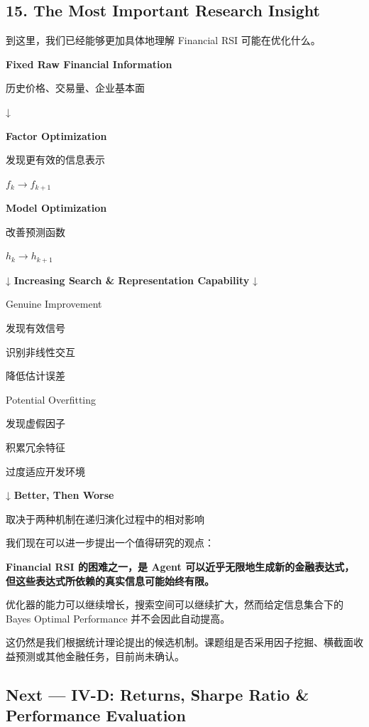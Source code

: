 \hypertarget{part-4-63-0001-the-most-important-research-insight}{%
\subsection{15. The Most Important Research Insight}\label{part-4-63-0001-the-most-important-research-insight}}

到这里，我们已经能够更加具体地理解 Financial RSI 可能在优化什么。

\textbf{Fixed Raw Financial Information}

历史价格、交易量、企业基本面

↓

\textbf{Factor Optimization}

发现更有效的信息表示

\(f_k\rightarrow f_{k+1}\)

\textbf{Model Optimization}

改善预测函数

\(h_k\rightarrow h_{k+1}\)

↓ \textbf{Increasing Search \& Representation Capability} ↓

Genuine Improvement

发现有效信号

识别非线性交互

降低估计误差

Potential Overfitting

发现虚假因子

积累冗余特征

过度适应开发环境

↓ \textbf{Better, Then Worse}

取决于两种机制在递归演化过程中的相对影响

我们现在可以进一步提出一个值得研究的观点：

\textbf{Financial RSI 的困难之一，是 Agent 可以近乎无限地生成新的金融表达式，但这些表达式所依赖的真实信息可能始终有限。}

优化器的能力可以继续增长，搜索空间可以继续扩大，然而给定信息集合下的 Bayes Optimal Performance 并不会因此自动提高。

这仍然是我们根据统计理论提出的候选机制。课题组是否采用因子挖掘、横截面收益预测或其他金融任务，目前尚未确认。

\hypertarget{part-4-63-0001-next-iv-d-returns-sharpe-ratio-performance-evaluation}{%
\subsection{Next --- IV-D: Returns, Sharpe Ratio \& Performance Evaluation}\label{part-4-63-0001-next-iv-d-returns-sharpe-ratio-performance-evaluation}}

